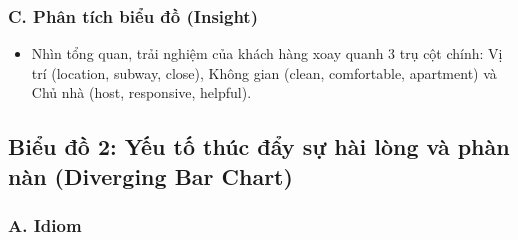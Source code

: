 \subsubsection*{C. Phân tích biểu đồ (Insight)}

\begin{itemize}
    \item Nhìn tổng quan, trải nghiệm của khách hàng xoay quanh 3 trụ cột chính: Vị trí (location, subway, close), Không gian (clean, comfortable, apartment) và Chủ nhà (host, responsive, helpful).
\end{itemize}

\subsection{Biểu đồ 2: Yếu tố thúc đẩy sự hài lòng và phàn nàn (Diverging Bar Chart)}

\subsubsection*{A. Idiom}


